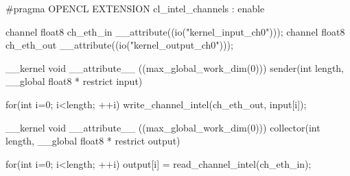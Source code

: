 \begin{CppCode}
#pragma OPENCL EXTENSION cl_intel_channels : enable

channel float8 ch_eth_in __attribute((io("kernel_input_ch0")));
channel float8 ch_eth_out __attribute((io("kernel_output_ch0")));

__kernel void __attribute__ ((max_global_work_dim(0)))
sender(int length, __global float8 * restrict input)
{

    for(int i=0; i<length; ++i)
        write_channel_intel(ch_eth_out, input[i]);


}

__kernel void __attribute__ ((max_global_work_dim(0)))
collector(int length, __global float8 * restrict output)
{

    for(int i=0; i<length; ++i)
        output[i] = read_channel_intel(ch_eth_in);

}
\end{CppCode}



